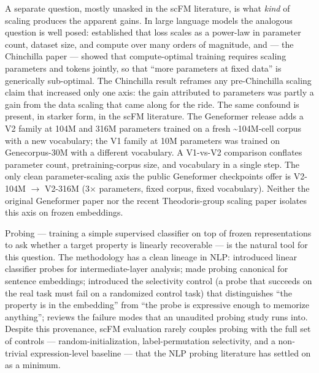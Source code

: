 \documentclass[
  11pt,
]{article}
\begin{document}
A separate question, mostly unasked in the scFM literature, is what
\emph{kind} of scaling produces the apparent gains. In large language
models the analogous question is well posed: \citet{kaplan2020scaling}
established that loss scales as a power-law in parameter count, dataset
size, and compute over many orders of magnitude, and \citet{hoffmann2022chinchilla} --- the Chinchilla paper --- showed that compute-optimal
training requires scaling parameters and tokens jointly, so that ``more
parameters at fixed data'' is generically sub-optimal. The Chinchilla
result reframes any pre-Chinchilla scaling claim that increased only one
axis: the gain attributed to parameters was partly a gain from the data
scaling that came along for the ride. The same confound is present, in
starker form, in the scFM literature. The Geneformer release adds a V2
family at 104M and 316M parameters trained on a fresh
\textasciitilde104M-cell corpus with a new vocabulary; the V1 family at
10M parameters was trained on Genecorpus-30M with a different
vocabulary. A V1-vs-V2 comparison conflates parameter count,
pretraining-corpus size, and vocabulary in a single step. The only clean
parameter-scaling axis the public Geneformer checkpoints offer is
V2-104M $\to$ V2-316M (3$\times$ parameters, fixed corpus, fixed vocabulary).
Neither the original Geneformer paper nor the recent Theodoris-group
scaling paper \citep{venkatesh2026} isolates this axis on frozen
embeddings.

Probing --- training a simple supervised classifier on top of frozen
representations to ask whether a target property is linearly recoverable
--- is the natural tool for this question. The methodology has a clean
lineage in NLP: \citet{alainbengio2016probes} introduced linear
classifier probes for intermediate-layer analysis; \citet{conneau2018}
made probing canonical for sentence embeddings; \citet{hewitt2019}
introduced the selectivity control (a probe that succeeds on the real
task must fail on a randomized control task) that distinguishes ``the
property is in the embedding'' from ``the probe is expressive enough to
memorize anything''; \citet{belinkov2022} reviews the failure modes that an
unaudited probing study runs into. Despite this provenance, scFM
evaluation rarely couples probing with the full set of controls ---
random-initialization, label-permutation selectivity, and a non-trivial
expression-level baseline --- that the NLP probing literature has
settled on as a minimum.
\end{document}
